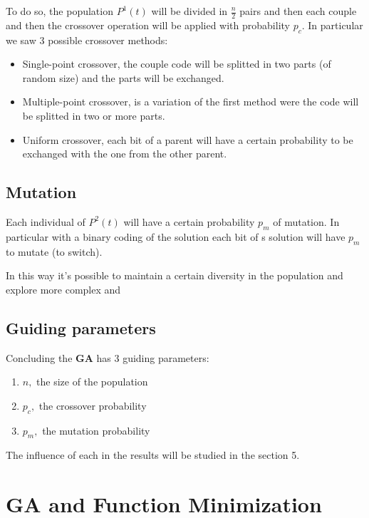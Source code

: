 \documentclass{article}
\newcommand{\tmstrong}[1]{\textbf{#1}}
\begin{document}
To do so, the population $P^1 (t)$ will be divided in $\frac{n}{2}$ pairs and
then each couple and then the crossover operation will be applied with
probability $p_c$. In particular we saw 3 possible crossover methods:
\begin{itemize}
  \item Single-point crossover, the couple code will be splitted in two parts
  (of random size) and the parts will be exchanged.
  
  \item Multiple-point crossover, is a variation of the first method were the
  code will be splitted in two or more parts.
  
  \item Uniform crossover, each bit of a parent will have a certain
  probability to be exchanged with the one from the other parent.
\end{itemize}

\subsection{Mutation}

Each individual of $P^2 (t)$ will have a certain probability $p_m$ of
mutation. In particular with a binary coding of the solution each bit of s
solution will have $p_m$ to mutate (to switch).

In this way it's possible to maintain a certain diversity in the population
and explore more complex and \ \

\subsection{Guiding parameters}

Concluding the {\tmstrong{GA}} has 3 guiding parameters:
\begin{enumerate}
  \item $n,$ the size of the population
  
  \item $p_c,$ the crossover probability
  
  \item $p_m,$ the mutation probability
\end{enumerate}
The influence of each in the results will be studied in the section 5.

\section{GA and Function Minimization}
\end{document}
